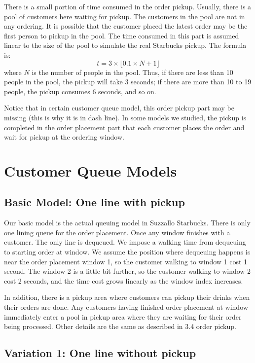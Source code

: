 \documentclass[a4paper]{article}
\begin{document}
There is a small portion of time consumed in the order pickup. Usually, there is a pool of customers here waiting for pickup. The customers in the pool are not in any ordering. It is possible that the customer placed the latest order may be the first person to pickup in the pool. The time consumed in this part is assumed linear to the size of the pool to simulate the real Starbucks pickup. The formula is:
\[t=3\times\lfloor 0.1\times N+1\rfloor\]
where $N$ is the number of people in the pool. Thus, if there are less than 10 people in the pool, the pickup will take 3 seconds; if there are more than 10 to 19 people, the pickup consumes 6 seconds, and so on.

Notice that in certain customer queue model, this order pickup part may be missing (this is why it is in dash line). In some models we studied, the pickup is completed in the order placement part that each customer places the order and wait for pickup at the ordering window.

\newpage
\section{Customer Queue Models}

\subsection{Basic Model: One line with pickup}

Our basic model is the actual queuing model in Suzzallo Starbucks. There is only one lining queue for the order placement. Once any window finishes with a customer. The only line is dequeued. We impose a walking time from dequeuing to starting order at window. We assume the position where dequeuing happens is near the order placement window 1, so the customer walking to window 1 cost 1 second. The window 2 is a little bit further, so the customer walking to window 2 cost 2 seconds, and the time cost grows linearly as the window index increases.

In addition, there is a pickup area where customers can pickup their drinks when their orders are done. Any customers having finished order placement at window immediately enter a pool in pickup area where they are waiting for their order being processed. Other details are the same as described in 3.4 order pickup.

\subsection{Variation 1: One line without pickup}
\end{document}
